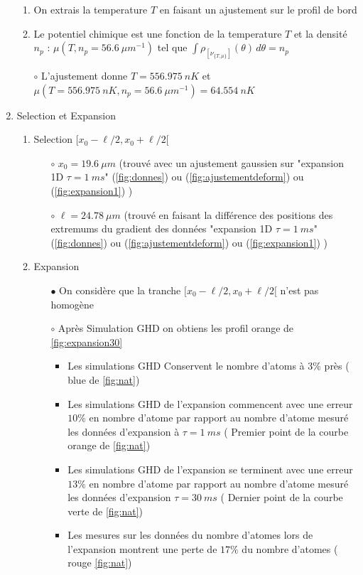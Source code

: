 \documentclass[a3, 10pt,twoside]{article}          %
\theoremstyle{plain}
\theoremstyle{definition}
\theoremstyle{remark}
\theoremstyle{definition} %
\def\OliveGreen{OliveGreen}
\begin{document}
\begin{enumerate}[label =\Alph*)]
					\begin{enumerate}[label =\alph*)]
						\item On extrais la temperature $T$ en faisant un ajustement sur le profil de bord 
						\item Le potentiel chimique est une fonction de la temperature $T$ et la densité $n_p$ : $\mu( T , n_p = 56.6 ~{\mu m}^{-1} )$ tel que $\int \rho_{ [ \nu_{\{T,\mu\}} ] } (\theta) \, d \theta  = n_p $ 
						\item[$\circ$] L'ajustement donne $T = 556.975 ~nK$ et $\mu( T=556.975 ~nK , n_p = 56.6 ~{\mu m}^{-1} ) = 64.554~nK $ 
					\end{enumerate}
				\item Selection et Expansion 
					\begin{enumerate}[label =\alph*)]
						\item Selection $[ x_0 - \ell/2 , x_0 + \ell/2[$ 
							\begin{itemize}
								\item[$\circ$] $x_0 = 19.6 ~\mu m $ (trouvé avec un ajustement gaussien sur {\color{OliveGreen}"expansion 1D $\tau =1~ms$" (\ref{fig:donnes})} ou {\color{orange} (\ref{fig:ajustementdeform}) } ou {\color{blue}(\ref{fig:expansion1})} ) 
								\item[$\circ$] $\ell = 24.78 ~ \mu m $ (trouvé en faisant la différence des positions des extremums du gradient des données {\color{OliveGreen}"expansion 1D $\tau =1~ms$" (\ref{fig:donnes})} ou {\color{orange} (\ref{fig:ajustementdeform}) } ou {\color{blue}(\ref{fig:expansion1})} )
							\end{itemize} 
						\item Expansion 
							\begin{itemize}
								\item[$\bullet$]	 On considère que la tranche $[ x_0 - \ell/2 , x_0 + \ell/2[$ n'est pas homogène 
								\item[$\circ$] Après Simulation GHD on obtiens les profil {\color{orange} orange de \ref{fig:expansion30}}  
									\begin{itemize}
										\item Les simulations GHD Conservent le nombre d'atoms à $3\%$ près ({\color{blue} blue de \ref{fig:nat}})
										\item Les simulations GHD de l'expansion commencent avec une erreur $10\%$ en nombre d'atome par rapport au nombre d'atome mesuré les données d'expansion à $\tau = 1~ms$ ({\color{orange} Premier point de la courbe orange de \ref{fig:nat}}) 
										\item Les simulations GHD de l'expansion se terminent avec une erreur $13\%$ en nombre d'atome par rapport au nombre d'atome mesuré les données d'expansion $\tau = 30~ms$ ({\color{\OliveGreen} Dernier point de la courbe verte de \ref{fig:nat}})
										\item Les mesures sur les données du nombre d'atomes lors de l'expansion montrent une perte de $17\%$ du nombre d'atomes ({\color{red} rouge \ref{fig:nat}})
									\end{itemize}	 	
							\end{itemize}


\end{enumerate}
\end{enumerate}
\end{document}

